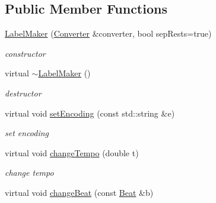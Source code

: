 \subsection*{\-Public \-Member \-Functions}
\begin{DoxyCompactItemize}
\item 
\hypertarget{classsinsy_1_1LabelMaker_adb707f0e1edc6a3137b8468878b1fca6}{\hyperlink{classsinsy_1_1LabelMaker_adb707f0e1edc6a3137b8468878b1fca6}{\-Label\-Maker} (\hyperlink{classsinsy_1_1Converter}{\-Converter} \&converter, bool sep\-Rests=true)}\label{classsinsy_1_1LabelMaker_adb707f0e1edc6a3137b8468878b1fca6}

\begin{DoxyCompactList}\small\item\em constructor \end{DoxyCompactList}\item 
\hypertarget{classsinsy_1_1LabelMaker_a2d52840e342de1accafd1f44a5641854}{virtual \hyperlink{classsinsy_1_1LabelMaker_a2d52840e342de1accafd1f44a5641854}{$\sim$\-Label\-Maker} ()}\label{classsinsy_1_1LabelMaker_a2d52840e342de1accafd1f44a5641854}

\begin{DoxyCompactList}\small\item\em destructor \end{DoxyCompactList}\item 
\hypertarget{classsinsy_1_1LabelMaker_a978e61679f89b990d5d796847bd750c1}{virtual void \hyperlink{classsinsy_1_1LabelMaker_a978e61679f89b990d5d796847bd750c1}{set\-Encoding} (const std\-::string \&e)}\label{classsinsy_1_1LabelMaker_a978e61679f89b990d5d796847bd750c1}

\begin{DoxyCompactList}\small\item\em set encoding \end{DoxyCompactList}\item 
\hypertarget{classsinsy_1_1LabelMaker_a278703b8ec92253e3095c0d6e98edc9b}{virtual void \hyperlink{classsinsy_1_1LabelMaker_a278703b8ec92253e3095c0d6e98edc9b}{change\-Tempo} (double t)}\label{classsinsy_1_1LabelMaker_a278703b8ec92253e3095c0d6e98edc9b}

\begin{DoxyCompactList}\small\item\em change tempo \end{DoxyCompactList}\item 
\hypertarget{classsinsy_1_1LabelMaker_a6864d59e45b4b06678950d40a9bfc3cc}{virtual void \hyperlink{classsinsy_1_1LabelMaker_a6864d59e45b4b06678950d40a9bfc3cc}{change\-Beat} (const \hyperlink{classsinsy_1_1Beat}{\-Beat} \&b)}\label{classsinsy_1_1LabelMaker_a6864d59e45b4b06678950d40a9bfc3cc}


\end{DoxyCompactItemize}
